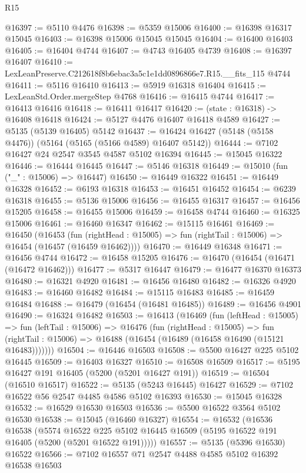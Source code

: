 \begin{lexlean}{R15}
\begin{coremodule}
{{{{{{{{{{{@16397 := @5110 @4476
@16398 := @5359 @15006
@16400 := @16398 @16317 @15045
@16403 := @16398 @15006 @15045 @15045
@16404 := @16400 @16403
@16405 := @16404 @4744
@16407 := @4743 @16405 @4739
@16408 := @16397 @16407
@16410 := LexLeanPreserve.C212618f8b6ebac3a5c1e1dd0896866e7.R15.__fits_115 @4744
@16411 := @5116 @16410
@16413 := @5919 @16318 @16404
@16415 := LexLeanStd.Order.mergeStep @4768
@16416 := @16415 @4744
@16417 := @16413 @16416
@16418 := @16411 @16417
@16420 := (state : @16318) -> @16408 @16418
@16424 := @5127 @4476 @16407 @16418 @4589
@16427 := @5135 (@5139 @16405) @5142
@16437 := @16424 @16427 (@5148 (@5158 @4476)) (@5164 (@5165 (@5166 @4589) @16407 @5142))
@16444 := @7102 @16427 @24 @2547 @3545 @4587 @5102 @16394
@16445 := @15045 @16322
@16446 := @16444 @16445
@16447 := @5146 @16318
@16449 := @15010 (fun ("_" : @15006) => @16447)
@16450 := @16449 @16322
@16451 := @16449 @16328
@16452 := @6193 @16318
@16453 := @16451 @16452
@16454 := @6239 @16318
@16455 := @5136 @15006
@16456 := @16455 @16317
@16457 := @16456 @15205
@16458 := @16455 @15006
@16459 := @16458 @4744
@16460 := @16325 @15006
@16461 := @16460 @16347
@16462 := @15115 @16461
@16469 := @16450
    (@16453
      (fun (rightHead : @15005) => fun (rightTail : @15006) => @16454 (@16457 (@16459 @16462))))
@16470 := @16449 @16348
@16471 := @16456 @4744
@16472 := @16458 @15205
@16476 := @16470 (@16454 (@16471 (@16472 @16462)))
@16477 := @5317 @16447
@16479 := @16477 @16370 @16373
@16480 := @16321 @4920
@16481 := @16456 @16480
@16482 := @16326 @4920
@16483 := @16460 @16482
@16484 := @15115 @16483
@16485 := @16459 @16484
@16488 := @16479 (@16454 (@16481 @16485))
@16489 := @16456 @4901
@16490 := @16324 @16482
@16503 := @16413
    (@16469
      (fun (leftHead : @15005) =>
      fun (leftTail : @15006) =>
      @16476
        (fun (rightHead : @15005) =>
        fun (rightTail : @15006) => @16488 (@16454 (@16489 (@16458 @16490 (@15121 @16483)))))))
@16504 := @16446 @16503
@16508 := @5500 @16427 @225 @5102 @16445
@16509 := @16403 @16327
@16510 := @16508 @16509
@16517 := @5195 @16427 @191 @16405 (@5200 (@5201 @16427 @191))
@16519 := @16504 (@16510 @16517)
@16522 := @5135 (@5243 @16445) @16427
@16529 := @7102 @16522 @56 @2547 @4485 @4586 @5102 @16393
@16530 := @15045 @16328
@16532 := @16529 @16530 @16503
@16536 := @5500 @16522 @3564 @5102 @16530
@16538 := @15045 (@16460 @16327)
@16554 := @16532
    (@16536
      @16538
      (@5574
        @16522
        @225
        @5102
        @16445
        @16509
        (@5195 @16522 @191 @16405 (@5200 (@5201 @16522 @191)))))
@16557 := @5135 (@5396 @16530) @16522
@16566 := @7102 @16557 @71 @2547 @4488 @4585 @5102 @16392 @16538 @16503
}}}}}}}}}}}
\end{coremodule}
\end{lexlean}
